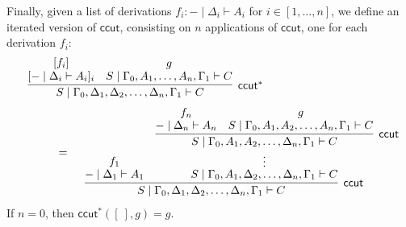 \documentclass[sn-mathphys-num]{sn-jnl}%
\newcommand{\GG}{\Gamma}
\newcommand{\GD}{\Delta}
\newcommand{\vd}{\vdash}
\newcommand{\lolli}{\multimap}
\newcommand{\lleft}{{\lolli}\mathsf{L}}
\newcommand{\lright}{{\lolli}\mathsf{R}}
\newcommand{\proofbox}[1]{\begin{tabular}{l} #1 \end{tabular}}
\theoremstyle{thmstyleone}%
\theoremstyle{thmstyletwo}%
\theoremstyle{thmstylethree}%
\newtheorem{definition}[theorem]{Definition}%
\begin{document}

Finally, given a list of derivations $f_i : {-} \mid \GD_i \vd A_i$ for $i \in [1,\dots , n]$, we define an iterated version of $\mathsf{ccut}$, consisting on $n$ applications of $\mathsf{ccut}$, one for each derivation $f_i$:
\begin{equation}\label{ccut*}
  \begin{array}{l}
    \proofbox{\infer[\mathsf{ccut}^*]{S \mid \GG_0,\GD_1,\GD_2,\dots,\GD_n,\GG_1 \vd C}{
    \deduce{[ {-} \mid \GD_i \vd A_i]_i}{[f_i]}
    &
    \deduce{S \mid \GG_0,A_1,\dots,A_n,\GG_1 \vd C}{g}
    }}
    \\[20pt]
    \qquad \qquad =
    \proofbox{
    \infer[\mathsf{ccut}]{S \mid \GG_0,\GD_1,\GD_2,\dots,\GD_n,\GG_1 \vd C}{
    \deduce{{-} \mid \GD_1 \vd A_1}{f_1}
    &
    \deduce[\vdots]{S \mid \GG_0,A_1,\GD_2,\dots,\GD_n,\GG_1 \vd C}{
    \infer[\mathsf{ccut}]{S \mid \GG_0,A_1,A_2,\dots,\GD_n,\GG_1 \vd C}{
    \deduce{{-} \mid \GD_n \vd A_n}{f_n}
    &
    \deduce{S \mid \GG_0, A_1, A_2,\dots,A_n, \GG_1 \vd C}{g}
    }
    }
    }
    }
  \end{array}
\end{equation}
If $n=0$, then $\mathsf{ccut}^* ([\ ],g) = g$.
\end{document}
